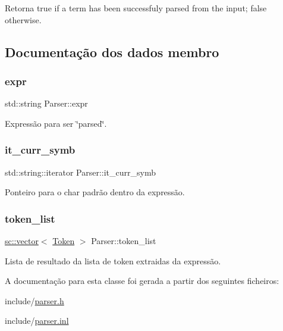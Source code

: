 \begin{DoxyReturn}{Retorna}
true if a term has been successfuly parsed from the input; false otherwise. 
\end{DoxyReturn}


\subsection{Documentação dos dados membro}
\mbox{\label{classParser_a6429f38abf0207bc14d64bacc399b3f9}} 
\subsubsection{\texorpdfstring{expr}{expr}}
{\footnotesize\ttfamily std\+::string Parser\+::expr\hspace{0.3cm}{\ttfamily [private]}}



Expressão para ser \char`\"{}parsed\char`\"{}. 

\mbox{\label{classParser_a7036e94a1d0b3973d126a2023a91b7ec}} 
\subsubsection{\texorpdfstring{it\+\_\+curr\+\_\+symb}{it\_curr\_symb}}
{\footnotesize\ttfamily std\+::string\+::iterator Parser\+::it\+\_\+curr\+\_\+symb\hspace{0.3cm}{\ttfamily [private]}}



Ponteiro para o char padrão dentro da expressão. 

\mbox{\label{classParser_a87c81225df0bfa24bcd321bcbdd7af26}} 
\subsubsection{\texorpdfstring{token\+\_\+list}{token\_list}}
{\footnotesize\ttfamily \hyperlink{classsc_1_1vector}{sc\+::vector}$<$ \hyperlink{structToken}{Token} $>$ Parser\+::token\+\_\+list\hspace{0.3cm}{\ttfamily [private]}}



Lista de resultado da lista de token extraidas da expressão. 



A documentação para esta classe foi gerada a partir dos seguintes ficheiros\+:\begin{DoxyCompactItemize}
\item 
include/\hyperlink{parser_8h}{parser.\+h}\item 
include/\hyperlink{parser_8inl}{parser.\+inl}\end{DoxyCompactItemize}
